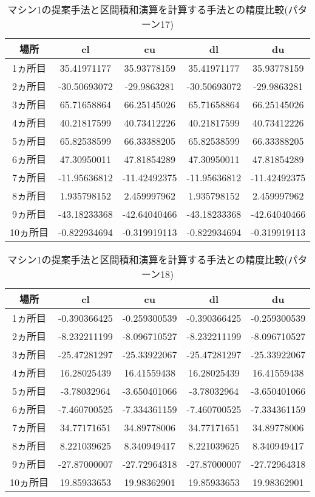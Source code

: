 \documentclass[11pt,a4paper]{jsreport}
\theoremstyle{definition}
\begin{document}
\begin{table}[H]
\centering
\begin{tabular}{|c|c|c|c|c|}
\hline
場所 & cl & cu & dl & du \\ \hline
1ヵ所目 & 35.41971177 & 35.93778159 & 35.41971177 & 35.93778159 \\ \hline
2ヵ所目 & -30.50693072 & -29.9863281 & -30.50693072 & -29.9863281 \\ \hline
3ヵ所目 & 65.71658864 & 66.25145026 & 65.71658864 & 66.25145026 \\ \hline
4ヵ所目 & 40.21817599 & 40.73412226 & 40.21817599 & 40.73412226 \\ \hline
5ヵ所目 & 65.82538599 & 66.33388205 & 65.82538599 & 66.33388205 \\ \hline
6ヵ所目 & 47.30950011 & 47.81854289 & 47.30950011 & 47.81854289 \\ \hline
7ヵ所目 & -11.95636812 & -11.42492375 & -11.95636812 & -11.42492375 \\ \hline
8ヵ所目 & 1.935798152 & 2.459997962 & 1.935798152 & 2.459997962 \\ \hline
9ヵ所目 & -43.18233368 & -42.64040466 & -43.18233368 & -42.64040466 \\ \hline
10ヵ所目 & -0.822934694 & -0.319919113 & -0.822934694 & -0.319919113 \\ \hline
\end{tabular}
\caption{マシン1の提案手法と区間積和演算を計算する手法との精度比較(パターン17)}
\end{table}

\begin{table}[H]
\centering
\begin{tabular}{|c|c|c|c|c|}
\hline
場所 & cl & cu & dl & du \\ \hline
1ヵ所目 & -0.390366425 & -0.259300539 & -0.390366425 & -0.259300539 \\ \hline
2ヵ所目 & -8.232211199 & -8.096710527 & -8.232211199 & -8.096710527 \\ \hline
3ヵ所目 & -25.47281297 & -25.33922067 & -25.47281297 & -25.33922067 \\ \hline
4ヵ所目 & 16.28025439 & 16.41559438 & 16.28025439 & 16.41559438 \\ \hline
5ヵ所目 & -3.78032964 & -3.650401066 & -3.78032964 & -3.650401066 \\ \hline
6ヵ所目 & -7.460700525 & -7.334361159 & -7.460700525 & -7.334361159 \\ \hline
7ヵ所目 & 34.77171651 & 34.89778006 & 34.77171651 & 34.89778006 \\ \hline
8ヵ所目 & 8.221039625 & 8.340949417 & 8.221039625 & 8.340949417 \\ \hline
9ヵ所目 & -27.87000007 & -27.72964318 & -27.87000007 & -27.72964318 \\ \hline
10ヵ所目 & 19.85933653 & 19.98362901 & 19.85933653 & 19.98362901 \\ \hline
\end{tabular}
\caption{マシン1の提案手法と区間積和演算を計算する手法との精度比較(パターン18)}
\end{table}
\end{document}
